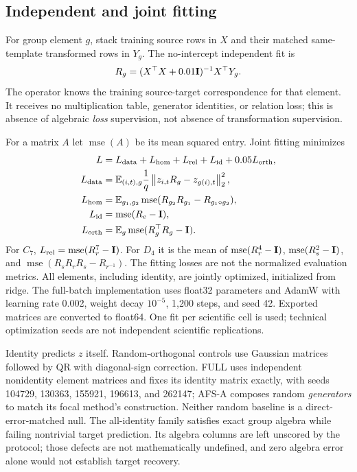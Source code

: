 \subsection{Independent and joint fitting}
For group element $g$, stack training source rows in $X$ and their matched same-template transformed rows in $Y_g$. The no-intercept independent fit is
\[
 R_g=(X^\top X+0.01\mathbf{I})^{-1}X^\top Y_g.
\]
The operator knows the training source-target correspondence for that element. It receives no multiplication table, generator identities, or relation loss; this is absence of algebraic \emph{loss} supervision, not absence of transformation supervision.

For a matrix $A$ let $\operatorname{mse}(A)$ be its mean squared entry. Joint fitting minimizes
\begin{align*}
 L&=L_{\rm data}+L_{\rm hom}+L_{\rm rel}+L_{\rm id}+0.05L_{\rm orth},\\
 L_{\rm data}&=\mathbb{E}_{(i,t),g}\frac{1}{q}\left\lVert z_{i,t}R_g-z_{g(i),t}\right\rVert_2^2,\\
 L_{\rm hom}&=\mathbb{E}_{g_1,g_2}\operatorname{mse}(R_{g_2}R_{g_1}-R_{g_1\circ g_2}),\\
 L_{\rm id}&=\operatorname{mse}(R_e-\mathbf{I}),\\
 L_{\rm orth}&=\mathbb{E}_g\operatorname{mse}(R_g^\top R_g-\mathbf{I}).
\end{align*}
For $C_7$, $L_{\rm rel}=\operatorname{mse}(R_r^7-\mathbf{I})$. For $D_4$ it is the mean of $\operatorname{mse}(R_r^4-\mathbf{I})$, $\operatorname{mse}(R_s^2-\mathbf{I})$, and $\operatorname{mse}(R_sR_rR_s-R_{r^{-1}})$. The fitting losses are not the normalized evaluation metrics. All elements, including identity, are jointly optimized, initialized from ridge. The full-batch implementation uses float32 parameters and AdamW with learning rate 0.002, weight decay $10^{-5}$, 1,200 steps, and seed 42. Exported matrices are converted to float64. One fit per scientific cell is used; technical optimization seeds are not independent scientific replications.

Identity predicts $z$ itself. Random-orthogonal controls use Gaussian matrices followed by QR with diagonal-sign correction. FULL uses independent nonidentity element matrices and fixes its identity matrix exactly, with seeds 104729, 130363, 155921, 196613, and 262147; AFS-A composes random \emph{generators} to match its focal method's construction. Neither random baseline is a direct-error-matched null. The all-identity family satisfies exact group algebra while failing nontrivial target prediction. Its algebra columns are left unscored by the protocol; those defects are not mathematically undefined, and zero algebra error alone would not establish target recovery.

